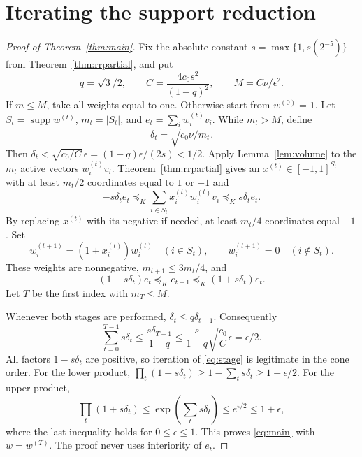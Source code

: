\documentclass[11pt]{article}
\newcommand{\supp}{\operatorname{supp}}
\newcommand{\one}{\mathbf 1}
\begin{document}
\section{Iterating the support reduction}

\begin{proof}[Proof of Theorem~\ref{thm:main}]
Fix the absolute constant
$s=\max\{1,s(2^{-5})\}$ from Theorem~\ref{thm:rrpartial}, and put
\begin{equation}\label{eq:constant}
 q=\sqrt{3}/2,
 \qquad C=\frac{4c_0s^2}{(1-q)^2},
 \qquad M=C\nu/\epsilon^2.
\end{equation}
If $m\le M$, take all weights equal to one. Otherwise start from
$w^{(0)}=\one$. Let $S_t=\supp w^{(t)}$, $m_t=|S_t|$, and
$e_t=\sum_i w_i^{(t)}v_i$. While $m_t>M$, define
\[
 \delta_t=\sqrt{c_0\nu/m_t}.
\]
Then
$\delta_t<\sqrt{c_0/C}\,\epsilon=(1-q)\epsilon/(2s)<1/2$.
Apply Lemma~\ref{lem:volume} to the $m_t$ active vectors
$w_i^{(t)}v_i$. Theorem~\ref{thm:rrpartial} gives an
$x^{(t)}\in[-1,1]^{S_t}$ with at least $m_t/2$ coordinates equal
to $1$ or $-1$ and
\begin{equation}\label{eq:updateerror}
 -s\delta_t e_t\preceq_K
 \sum_{i\in S_t}x_i^{(t)}w_i^{(t)}v_i
 \preceq_K s\delta_t e_t.
\end{equation}
By replacing $x^{(t)}$ with its negative if needed, at least $m_t/4$
coordinates equal $-1$. Set
\[
 w_i^{(t+1)}=(1+x_i^{(t)})w_i^{(t)}\quad(i\in S_t),
 \qquad w_i^{(t+1)}=0\quad(i\notin S_t).
\]
These weights are nonnegative, $m_{t+1}\le3m_t/4$, and
\begin{equation}\label{eq:stage}
 (1-s\delta_t)e_t\preceq_K e_{t+1}
 \preceq_K(1+s\delta_t)e_t.
\end{equation}
Let $T$ be the first index with $m_T\le M$.

Whenever both stages are performed,
$\delta_t\le q\delta_{t+1}$. Consequently
\begin{equation}\label{eq:errorbudget}
 \sum_{t=0}^{T-1}s\delta_t
 \le\frac{s\delta_{T-1}}{1-q}
 \le\frac{s}{1-q}\sqrt{\frac{c_0}{C}}\epsilon
 =\epsilon/2.
\end{equation}
All factors $1-s\delta_t$ are positive, so iteration of
\eqref{eq:stage} is legitimate in the cone order. For the lower product,
$\prod_t(1-s\delta_t)\ge1-\sum_t s\delta_t\ge1-\epsilon/2$.
For the upper product,
\[
 \prod_t(1+s\delta_t)
 \le\exp\left(\sum_t s\delta_t\right)
 \le e^{\epsilon/2}\le1+\epsilon,
\]
where the last inequality holds for $0\le\epsilon\le1$.
This proves \eqref{eq:main} with $w=w^{(T)}$.
The proof never uses interiority of $e_t$.
\end{proof}
\end{document}
